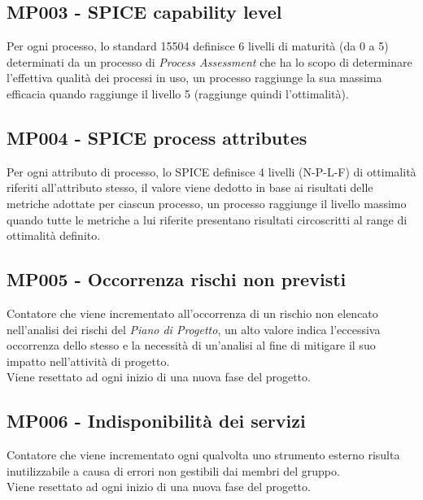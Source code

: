 \subsection{MP003 - SPICE capability level}
Per ogni processo, lo standard 15504 definisce 6 livelli di maturità (da 0 a 5) determinati da un processo di \textit{Process Assessment} che ha lo scopo di determinare l'effettiva qualità dei processi in uso, un processo raggiunge la sua massima efficacia quando raggiunge il livello 5 (raggiunge quindi l'ottimalità).

\subsection{MP004 - SPICE process attributes}
Per ogni attributo di processo, lo SPICE definisce 4 livelli (N-P-L-F) di ottimalità riferiti all'attributo stesso, il valore viene dedotto in base ai risultati delle metriche adottate per ciascun processo, un processo raggiunge il livello massimo quando tutte le metriche a lui riferite presentano risultati circoscritti al range di ottimalità definito.

\subsection{MP005 - Occorrenza rischi non previsti}
Contatore che viene incrementato all'occorrenza di un rischio non elencato nell'analisi dei rischi del \textit{Piano di Progetto}, un alto valore indica l'eccessiva occorrenza dello stesso e la necessità di un'analisi al fine di mitigare il suo impatto nell'attività di progetto.\\
Viene resettato ad ogni inizio di una nuova fase del progetto.

\subsection{MP006 - Indisponibilità dei servizi}
Contatore che viene incrementato ogni qualvolta uno strumento esterno risulta inutilizzabile a causa di errori non gestibili dai membri del gruppo.\\
Viene resettato ad ogni inizio di una nuova fase del progetto.

